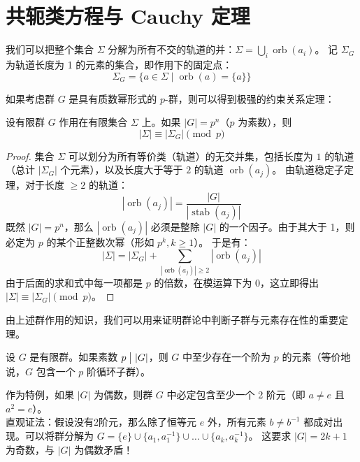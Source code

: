 \documentclass[11pt]{article}
\begin{document}
\section{共轭类方程与 Cauchy 定理}

我们可以把整个集合 $\Sigma$ 分解为所有不交的轨道的并：$\Sigma = \bigcup_{i} \operatorname{orb}(a_i)$。
记 $\Sigma_G$ 为轨道长度为 1 的元素的集合，即作用下的固定点：
\[
\Sigma_G = \{a \in \Sigma \mid \operatorname{orb}(a) = \{a\}\}
\]

如果考虑群 $G$ 是具有质数幂形式的 $p$-群，则可以得到极强的约束关系定理：

\begin{cntheorem}[$p$-群的固定点同余定理]
    设有限群 $G$ 作用在有限集合 $\Sigma$ 上。如果 $|G| = p^n$（$p$ 为素数），则
    \[
    |\Sigma| \equiv |\Sigma_G| \pmod p
    \]
\end{cntheorem}

\begin{proof}
    集合 $\Sigma$ 可以划分为所有等价类（轨道）的无交并集，包括长度为 $1$ 的轨道（总计 $|\Sigma_G|$ 个元素），以及长度大于等于 $2$ 的轨道 $\operatorname{orb}(a_j)$。
    由轨道稳定子定理，对于长度 $\ge 2$ 的轨道：
    \[
    |\operatorname{orb}(a_j)| = \frac{|G|}{|\operatorname{stab}(a_j)|}
    \]
    既然 $|G|=p^n$，那么 $|\operatorname{orb}(a_j)|$ 必须是整除 $|G|$ 的一个因子。由于其大于 1，则必定为 $p$ 的某个正整数次幂（形如 $p^k, k \ge 1$）。
    于是有：
    \[
    |\Sigma| = |\Sigma_G| + \sum_{|\operatorname{orb}(a_j)| \ge 2} |\operatorname{orb}(a_j)| 
    \]
    由于后面的求和式中每一项都是 $p$ 的倍数，在模运算下为 0，这立即得出 $|\Sigma| \equiv |\Sigma_G| \pmod p$。
\end{proof}

由上述群作用的知识，我们可以用来证明群论中判断子群与元素存在性的重要定理。

\begin{cntheorem}
    设 $G$ 是有限群。如果素数 $p \bigm| |G|$，则 $G$ 中至少存在一个阶为 $p$ 的元素（等价地说，$G$ 包含一个 $p$ 阶循环子群）。
\end{cntheorem}

\begin{cncorollary}
    作为特例，如果 $|G|$ 为偶数，则群 $G$ 中必定包含至少一个 2 阶元（即 $a \neq e$ 且 $a^2 = e$）。\\
    直观证法：假设没有2阶元，那么除了恒等元 $e$ 外，所有元素 $b \neq b^{-1}$ 都成对出现。可以将群分解为 $G = \{e\} \cup \{a_1, a_1^{-1}\} \cup \dots \cup \{a_k, a_k^{-1}\}$。
    这要求 $|G| = 2k + 1$ 为奇数，与 $|G|$ 为偶数矛盾！
\end{cncorollary}
\end{document}
